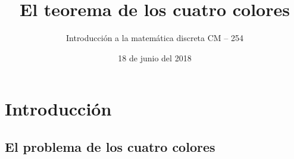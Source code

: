\documentclass[spanish,utf8]{beamer}
\title[Teorema de los cuatro colores]{\Huge\sffamily El teorema de los cuatro colores}
\subtitle{Introducción a la matemática discreta CM -- 254}
\author[Grupo N$^\circ6$]{%
	\texorpdfstring{%
		\begin{columns}
			\column{.3\linewidth}
			\centering
			C. Aznarán Laos %
			\column{.3\linewidth}
			\centering
			F. Cruz Ordoñez %
		\end{columns}
		\vspace{12pt}
		\begin{columns}
			\column{.3\linewidth}
			\centering
			G. Quiroz Gómez %
			\column{.3\linewidth}
			\centering
			J. Navío Torres %
		\end{columns}
	}
	{Author 1, Author 2, Author 3}
}
\institute[FC -- UNI]{\large%
	Facultad de Ciencias \and%
	Universidad Nacional de Ingeniería
}
\date{18 de junio del 2018}
\begin{document}
\begin{frame}[plain]
\maketitle
\end{frame}

\section{Introducción}

\begin{frame}{\contentsname}\transblindsvertical
\tableofcontents
\end{frame}

\subsection{El problema de los cuatro colores}

{
	\begin{frame}[plain]
\end{frame}
}
\end{document}
